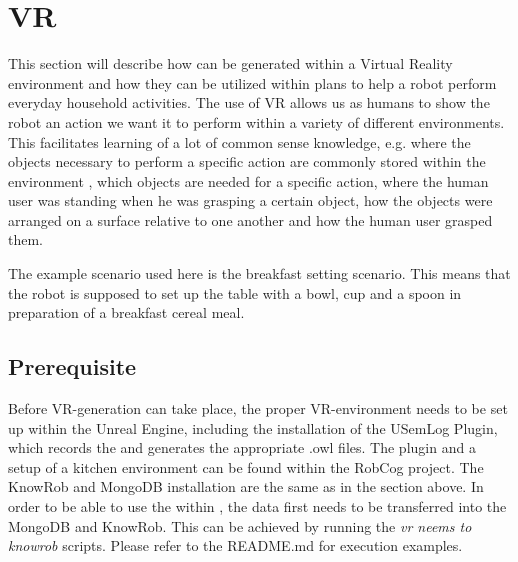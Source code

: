 \section{VR \neems}
\label{sec:vr-neem}
\lstset{style=lispcode}

This section will describe how \neems can be generated within a Virtual Reality environment and how they can be utilized within \cram plans to help a robot perform everyday household activities. The use of VR allows us as humans to show the robot an action we want it to perform within a variety of different environments. This facilitates learning of  a lot of common sense knowledge, e.g. where the objects necessary to perform a specific action are commonly stored within the environment , which objects are needed for a specific action, where the human user was standing when he was grasping a certain object, how the objects were arranged on a surface relative to one another and how the human user grasped them.  

The example scenario used here is the breakfast setting scenario. This means that the robot is supposed to set up the table with a bowl, cup and a spoon in preparation of a breakfast cereal meal. 

\subsection{Prerequisite}
Before VR-\neem generation can take place, the proper VR-environment needs to be set up within the Unreal Engine, including the installation of the USemLog Plugin, which records the \neems and generates the appropriate .owl files. The plugin and a setup of a kitchen environment can be found within the RobCog project. 
The KnowRob and MongoDB installation are the same as in the section above. 
In order to be able to use the \neems within \cram, the data first needs to be transferred into the MongoDB and KnowRob. This can be achieved by running the \textit{vr neems to knowrob} scripts. Please refer to the README.md for execution examples.

